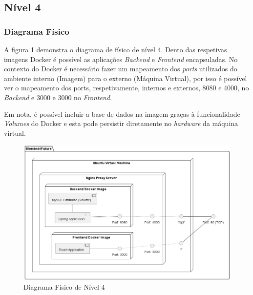 \subsection{Nível 4}

\subsubsection{Diagrama Físico} 

A figura \ref{fig:diagram-lvl4-physical} demonstra o diagrama de físico de nível 4. Dento das respetivas imagens \gls{Docker} é possível as aplicações  \textit{Backend} e \textit{Frontend} encapsuladas. No contexto do \gls{Docker} é necessário fazer um mapeamento dos \textit{ports} utilizados do ambiente interno (Imagem) para o externo (Máquina Virtual), por isso é possível ver o mapeamento dos ports, respetivamente, internos e externos, 8080 e 4000, no \textit{Backend} e 3000 e 3000 no \textit{Frontend}.

Em nota, é possível incluir a base de dados na imagem graças à funcionalidade \textit{Volumes} do Docker e esta pode persistir diretamente no \textit{hardware} da máquina virtual.

\begin{figure}[h!tbp]
    \centering
    \includegraphics[width=\linewidth]{capitulos/cap3-analisedoproblema/assets/arquiteturasistema/physical/physical_l4.png}
    \caption{Diagrama Físico de Nível 4}
    \label{fig:diagram-lvl4-physical}
\end{figure}